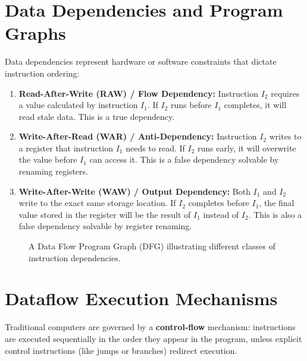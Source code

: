 \documentclass[12pt,a4paper,openany]{book}
\begin{document}
\section{Data Dependencies and Program Graphs}
Data dependencies represent hardware or software constraints that dictate instruction ordering:
\begin{enumerate}
    \item \textbf{Read-After-Write (RAW) / Flow Dependency:} Instruction $I_2$ requires a value calculated by instruction $I_1$. If $I_2$ runs before $I_1$ completes, it will read stale data. This is a true dependency.
    \item \textbf{Write-After-Read (WAR) / Anti-Dependency:} Instruction $I_2$ writes to a register that instruction $I_1$ needs to read. If $I_2$ runs early, it will overwrite the value before $I_1$ can access it. This is a false dependency solvable by renaming registers.
    \item \textbf{Write-After-Write (WAW) / Output Dependency:} Both $I_1$ and $I_2$ write to the exact same storage location. If $I_2$ completes before $I_1$, the final value stored in the register will be the result of $I_1$ instead of $I_2$. This is also a false dependency solvable by register renaming.
\end{enumerate}

\begin{figure}[htbp]
    \centering
    \caption{A Data Flow Program Graph (DFG) illustrating different classes of instruction dependencies.}
    \label{fig:dfg_dependencies}
\end{figure}

\section{Dataflow Execution Mechanisms}
Traditional computers are governed by a \textbf{control-flow} mechanism: instructions are executed sequentially in the order they appear in the program, unless explicit control instructions (like jumps or branches) redirect execution.
\end{document}
